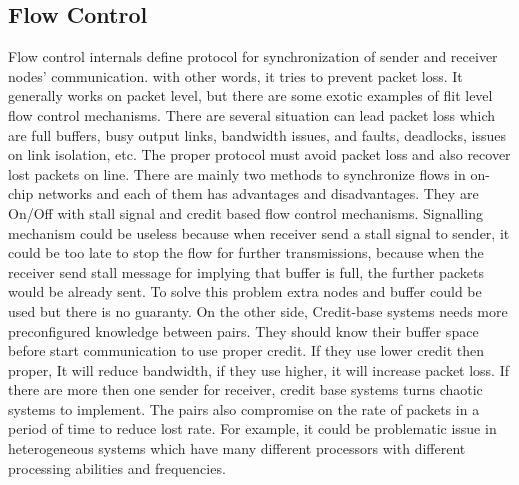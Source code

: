         \subsection{Flow Control}
        Flow control internals define protocol for synchronization of sender and receiver nodes' communication. with other words, it tries to prevent packet loss. It generally works on packet level, but there are some exotic examples of flit level flow control mechanisms. There are several situation can lead packet loss which are full buffers, busy output links, bandwidth issues, and faults, deadlocks, issues on link isolation, etc. The proper protocol must avoid packet loss and also recover lost packets on line. There are mainly two methods to synchronize flows in on-chip networks and each of them has advantages and disadvantages. They are On/Off with stall signal and credit based flow control mechanisms. Signalling mechanism could be useless because when receiver send a stall signal to sender, it could be too late to stop the flow for further transmissions, because when the receiver send stall message for implying that buffer is full, the further packets would be already sent. To solve this problem extra nodes and buffer could be used but there is no guaranty. On the other side, Credit-base systems needs more preconfigured knowledge between pairs. They should know their buffer space before start communication to use proper credit. If they use lower credit then proper, It will reduce bandwidth, if they use higher, it will increase packet loss. If there are more then one sender for receiver, credit base systems turns chaotic systems to implement. The pairs also compromise on the rate of packets in a period of time to reduce lost rate. For example, it could be problematic issue in heterogeneous systems which have many different processors with different processing abilities and frequencies.
